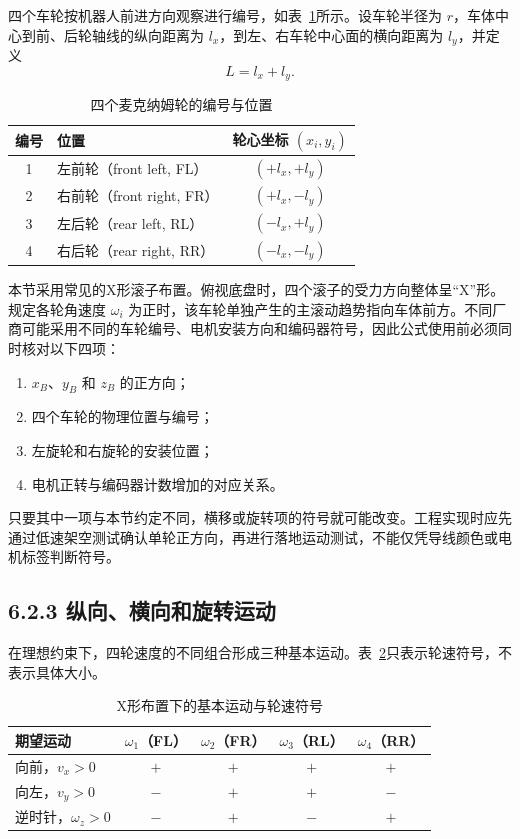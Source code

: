 \documentclass[UTF8,zihao=-4]{ctexart}
\begin{document}
四个车轮按机器人前进方向观察进行编号，如表~\ref{tab:wheel-numbering}所示。设车轮半径为 $r$，车体中心到前、后轮轴线的纵向距离为 $l_x$，到左、右车轮中心面的横向距离为 $l_y$，并定义
\begin{equation}
  L = l_x + l_y.
  \label{eq:lever-arm}
\end{equation}

\begin{table}[htbp]
  \centering
  \caption{四个麦克纳姆轮的编号与位置}
  \label{tab:wheel-numbering}
  \begin{tabular}{clc}
    \toprule
    编号 & 位置 & 轮心坐标 $(x_i,y_i)$ \\
    \midrule
    1 & 左前轮（front left, FL）  & $(+l_x,+l_y)$ \\
    2 & 右前轮（front right, FR） & $(+l_x,-l_y)$ \\
    3 & 左后轮（rear left, RL）   & $(-l_x,+l_y)$ \\
    4 & 右后轮（rear right, RR）  & $(-l_x,-l_y)$ \\
    \bottomrule
  \end{tabular}
\end{table}

本节采用常见的X形滚子布置。俯视底盘时，四个滚子的受力方向整体呈“X”形。规定各轮角速度 $\omega_i$ 为正时，该车轮单独产生的主滚动趋势指向车体前方。不同厂商可能采用不同的车轮编号、电机安装方向和编码器符号，因此公式使用前必须同时核对以下四项：
\begin{enumerate}
  \item $x_B$、$y_B$ 和 $z_B$ 的正方向；
  \item 四个车轮的物理位置与编号；
  \item 左旋轮和右旋轮的安装位置；
  \item 电机正转与编码器计数增加的对应关系。
\end{enumerate}

只要其中一项与本节约定不同，横移或旋转项的符号就可能改变。工程实现时应先通过低速架空测试确认单轮正方向，再进行落地运动测试，不能仅凭导线颜色或电机标签判断符号。

\subsection*{6.2.3 纵向、横向和旋转运动}

在理想约束下，四轮速度的不同组合形成三种基本运动。表~\ref{tab:basic-motion}只表示轮速符号，不表示具体大小。

\begin{table}[htbp]
  \centering
  \caption{X形布置下的基本运动与轮速符号}
  \label{tab:basic-motion}
  \begin{tabular}{lcccc}
    \toprule
    期望运动 & $\omega_1$（FL） & $\omega_2$（FR） & $\omega_3$（RL） & $\omega_4$（RR） \\
    \midrule
    向前，$v_x>0$       & $+$ & $+$ & $+$ & $+$ \\
    向左，$v_y>0$       & $-$ & $+$ & $+$ & $-$ \\
    逆时针，$\omega_z>0$ & $-$ & $+$ & $-$ & $+$ \\
    \bottomrule
  \end{tabular}
\end{table}
\end{document}
